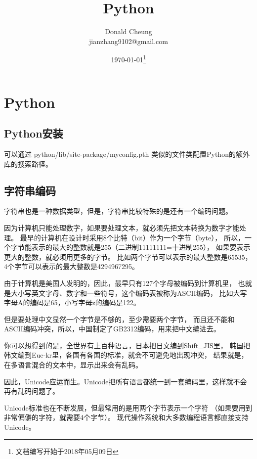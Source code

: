 \ifx\engineeringnotes\undefined
    \providecommand{\notesroot}{../..}
    \providecommand{\pythonroot}{.}

    \title{Python}
    \author{Donald Cheung\\jianzhang9102@gmail.com}
    \date{\today\footnote{文档编写开始于2018年05月09日}}

    
\else
    \providecommand{\pythonroot}{\engineeringroot/Python}
\fi

\chapter{Python}

\section{Python安装}
可以通过 python/lib/site-package/myconfig.pth 类似的文件类配置Python的额外库的搜索路径。

\section{字符串编码}
字符串也是一种数据类型，但是，字符串比较特殊的是还有一个编码问题。

因为计算机只能处理数字，如果要处理文本，就必须先把文本转换为数字才能处理。
最早的计算机在设计时采用8个比特（bit）作为一个字节（byte），
所以，一个字节能表示的最大的整数就是255（二进制11111111=十进制255），
如果要表示更大的整数，就必须用更多的字节。
比如两个字节可以表示的最大整数是65535，4个字节可以表示的最大整数是4294967295。

由于计算机是美国人发明的，因此，最早只有127个字母被编码到计算机里，
也就是大小写英文字母、数字和一些符号，这个编码表被称为ASCII编码，
比如大写字母A的编码是65，小写字母z的编码是122。

但是要处理中文显然一个字节是不够的，至少需要两个字节，
而且还不能和ASCII编码冲突，所以，中国制定了GB2312编码，用来把中文编进去。

你可以想得到的是，全世界有上百种语言，日本把日文编到Shift\_JIS里，
韩国把韩文编到Euc-kr里，各国有各国的标准，就会不可避免地出现冲突，
结果就是，在多语言混合的文本中，显示出来会有乱码。

因此，Unicode应运而生。Unicode把所有语言都统一到一套编码里，这样就不会再有乱码问题了。

Unicode标准也在不断发展，但最常用的是用两个字节表示一个字符
（如果要用到非常偏僻的字符，就需要4个字节）。
现代操作系统和大多数编程语言都直接支持Unicode。

